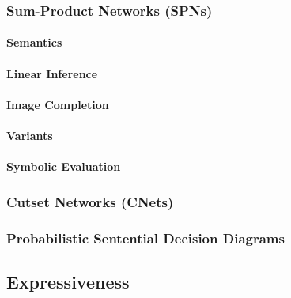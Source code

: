 			\subsubsection{Sum-Product Networks (SPNs)} %

				\paragraph{Semantics} %

				\paragraph{Linear Inference} %

				\paragraph{Image Completion} %

				\paragraph{Variants} %

				\paragraph{Symbolic Evaluation} %

			\subsubsection{Cutset Networks (CNets)} %

			\subsubsection{Probabilistic Sentential Decision Diagrams} %

		\subsection{Expressiveness} %

